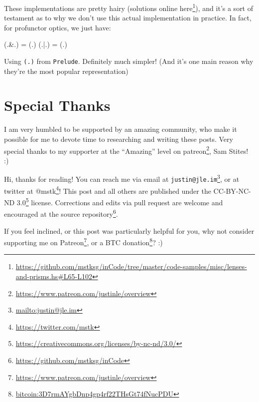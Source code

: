 \documentclass[]{article}
\newenvironment{Shaded}{}{}
\newcommand{\FunctionTok}[1]{\textcolor[rgb]{0.02,0.16,0.49}{#1}}
\newcommand{\NormalTok}[1]{#1}
\renewcommand{\href}[2]{#2\footnote{\url{#1}}}
\begin{document}
\begin{itemize}
  These implementations are pretty hairy (solutions
  \href{https://github.com/mstksg/inCode/tree/master/code-samples/misc/lenses-and-prisms.hs\#L65-L102}{online
  here}), and it's a sort of testament as to why we don't use this actual
  implementation in practice. In fact, for profunctor optics, we just have:

\begin{Shaded}
\begin{Highlighting}[]
\NormalTok{(}\FunctionTok{.&.}\NormalTok{) }\FunctionTok{=}\NormalTok{ (}\FunctionTok{.}\NormalTok{)}
\NormalTok{(}\FunctionTok{.|.}\NormalTok{) }\FunctionTok{=}\NormalTok{ (}\FunctionTok{.}\NormalTok{)}
\end{Highlighting}
\end{Shaded}

  Using \texttt{(.)} from \texttt{Prelude}. Definitely much simpler! (And it's
  one main reason why they're the most popular representation)
\end{itemize}

\hypertarget{special-thanks}{%
\section{Special Thanks}\label{special-thanks}}

I am very humbled to be supported by an amazing community, who make it possible
for me to devote time to researching and writing these posts. Very special
thanks to my supporter at the ``Amazing'' level on
\href{https://www.patreon.com/justinle/overview}{patreon}, Sam Stites! :)

Hi, thanks for reading! You can reach me via email at
\href{mailto:justin@jle.im}{\nolinkurl{justin@jle.im}}, or at twitter at
\href{https://twitter.com/mstk}{@mstk}! This post and all others are published
under the \href{https://creativecommons.org/licenses/by-nc-nd/3.0/}{CC-BY-NC-ND
3.0} license. Corrections and edits via pull request are welcome and encouraged
at \href{https://github.com/mstksg/inCode}{the source repository}.

If you feel inclined, or this post was particularly helpful for you, why not
consider \href{https://www.patreon.com/justinle/overview}{supporting me on
Patreon}, or a \href{bitcoin:3D7rmAYgbDnp4gp4rf22THsGt74fNucPDU}{BTC donation}?
:)
\end{document}
